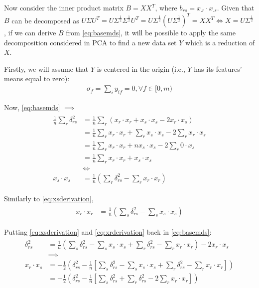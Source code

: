 \documentclass[12pt]{article}
\begin{document}
Now consider the inner product matrix $B=XX^T$, where $b_{rs}=x_{.r}\cdot x_{.s}$. Given that $B$ can be decomposed as $U\Sigma U^T=U\Sigma^\frac{1}{2} \Sigma^\frac{1}{2} U^T=U\Sigma^\frac{1}{2} (U\Sigma^\frac{1}{2})^T = XX^T\iff X=U\Sigma^\frac{1}{2}$, if we can derive $B$ from \ref{eq:basemds}, it will be possible to apply the same decomposition considered in PCA to find a new data set $Y$ which is a reduction of $X$. \cite{cox2001}

Firstly, we will assume that $Y$ is centered in the origin (i.e., $Y$ has its features' means equal to zero):
\begin{align}
\sigma_f = \sum_i y_{if} = 0, \forall f\in [0, m)
\end{align}

Now, \ref{eq:basemds} $\implies$
\begin{align}
\label{eq:xsderivation}
\begin{split}
\frac{1}{n} \sum_r \delta_{rs}^2
&= \frac{1}{n} \sum_r (x_r\cdot x_r + x_s\cdot x_s -2x_r\cdot x_s) \\
&= \frac{1}{n} \sum_r x_r\cdot x_r + \sum_r x_s\cdot x_s -2 \sum_r x_r\cdot x_s \\
&= \frac{1}{n} \sum_r x_r\cdot x_r + nx_s\cdot x_s -2 \sum_r 0\cdot x_s \\
&= \frac{1}{n} \sum_r x_r\cdot x_r + x_s\cdot x_s \\
&\iff \\
x_s\cdot x_s &= \frac{1}{n} (\sum_r \delta_{rs}^2 - \sum_r x_r\cdot x_r)
\end{split}
\end{align}

Similarly to \ref{eq:xsderivation},
\begin{align}
\label{eq:xrderivation}
\begin{split}
x_r\cdot x_r &= \frac{1}{n} (\sum_s \delta_{rs}^2 - \sum_s x_s\cdot x_s)
\end{split}
\end{align}

Putting \ref{eq:xsderivation} and \ref{eq:xrderivation} back in \ref{eq:basemds}:
\begin{align}
\label{eq:xrsderivation}
\begin{split}
\delta_{rs}^2 &= \frac{1}{n} (\sum_s \delta_{rs}^2 - \sum_s x_s\cdot x_s + \sum_r \delta_{rs}^2 - \sum_r x_r\cdot x_r) -2x_r\cdot x_s \\
&\implies \\
x_r\cdot x_s &= -\frac{1}{2} (\delta_{rs}^2 - \frac{1}{n} [\sum_s \delta_{rs}^2 - \sum_s x_s\cdot x_s + \sum_r \delta_{rs}^2 - \sum_r x_r\cdot x_r])\\
&= -\frac{1}{2} (\delta_{rs}^2 - \frac{1}{n} [\sum_s \delta_{rs}^2 + \sum_r \delta_{rs}^2 - 2\sum_r x_r\cdot x_r])\\
\end{split}
\end{align}
\end{document}
